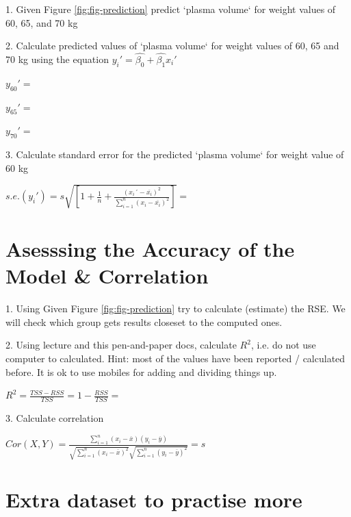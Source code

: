 \documentclass[12pt]{article}\usepackage[]{graphicx}\usepackage[]{color}
\begin{document}
1. Given Figure \ref{fig:fig-prediction} predict `plasma volume` for weight values of 60, 65, and 70 kg

2. Calculate predicted values of `plasma volume` for weight values of 60, 65 and 70 kg using the equation  $y_i'=\hat{\beta_0}+\hat{\beta_1}x_i'$

$y_{60}'=$ \vspace{0.2cm}

$y_{65}'=$ \vspace{0.2cm}

$y_{70}'=$ \vspace{0.2cm}


3. Calculate standard error for the predicted `plasma volume` for weight value of 60 kg \newline \vspace{0.4cm}

$s.e.(y_i')=s\sqrt{[1+\frac{1}{n}+\frac{(x_i´-\overline{x_i})^2}{\sum_{i=1}^{n}(x_i-\overline{x_i})^2}]}=$ \vspace{0.2cm}

\newpage
\section{Asesssing the Accuracy of the Model \& Correlation}
1. Using Given Figure \ref{fig:fig-prediction} try to calculate (estimate) the RSE. We will check which group gets results closeset to the computed ones. 

2. Using lecture and this pen-and-paper docs, calculate $R^2$, i.e. do not use computer to calculated. Hint: most of the values have been reported / calculated before. It is ok to use mobiles for adding and dividing things up. \newline \vspace{0.2cm}

$R^2=\frac{TSS-RSS}{TSS}=1-\frac{RSS}{TSS}=$ \vspace{0.2cm}

3. Calculate correlation \newline \vspace{0.2cm}

$Cor(X,Y)=\frac{\sum_{i=1}^{n}(x_i-\overline{x})(y_i-\overline{y})}{\sqrt{\sum_{i=1}^{n}(x_i-\overline{x})^2}\sqrt{\sum_{i=1}^{n}(y_i-\overline{y})^2}}=s$

\newpage
\section{Extra dataset to practise more}
\end{document}
